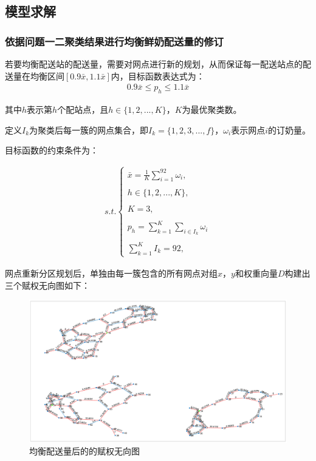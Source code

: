 \documentclass[withoutpreface,bwprint]{cumcmthesis} %
\begin{document}
\subsection{模型求解}	

\subsubsection{依据问题一二聚类结果进行均衡鲜奶配送量的修订}

若要均衡配送站的配送量，需要对网点进行新的规划，从而保证每一配送站点的配送量在均衡区间$\left [{0.9\bar{x},1.1\bar{x}}\right ]$内，目标函数表达式为：
\begin{align*}
	0.9\bar{x}\le {{p}_{h}}\le 1.1\bar{x}
\end{align*}

其中$h$表示第$h$个配站点，且$h\in \{1,2,...,K\}$，$K$为最优聚类数。

定义${{I}_{k}}$为聚类后每一簇的网点集合，即${{I}_{k}}=\{1,2,3,...,f\}$，${{ω}_{i}}$表示网点$i$的订奶量。

目标函数的约束条件为：

\begin{align*}
		s.t.\left \{{\begin{matrix}\bar{x}=\frac{1}{K}\sum_{i=1}^{92}{{{\omega }_{i}},}\\\\h\in \{1,2,...,K\},\\\\K=3,\\\\{{p}_{h}}=\sum_{k=1}^{K}{\sum\limits_{i\in {{I}_{k}}}{{{\omega }_{i}}}}\\\\\sum_{k=1}^{K}{{{I}_{k}}=92,}\end{matrix}}\right .
\end{align*}

网点重新分区规划后，单独由每一簇包含的所有网点对组$x，y$和权重向量$D$构建出三个赋权无向图如下：

\begin{figure}[htbp]
	\centering
	\includegraphics[width=0.85\linewidth]{figures/supply_G_red}
	\caption{均衡配送量后的的赋权无向图}
	\label{fig:supplygred}
\end{figure}
\end{document}
